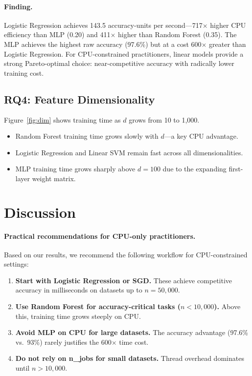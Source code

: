\documentclass[10pt,twocolumn]{article}
\begin{document}
\paragraph{Finding.}
Logistic Regression achieves 143.5 accuracy-units per second—717$\times$ higher 
CPU efficiency than MLP (0.20) and 411$\times$ higher than Random Forest (0.35). 
The MLP achieves the highest raw accuracy (97.6\%) but at a cost 600$\times$ 
greater than Logistic Regression.
For CPU-constrained practitioners, linear models provide a strong Pareto-optimal 
choice: near-competitive accuracy with radically lower training cost.

\subsection{RQ4: Feature Dimensionality}

Figure~\ref{fig:dim} shows training time as $d$ grows from 10 to 1,000.

\begin{itemize}[nosep,leftmargin=*]
  \item Random Forest training time grows slowly with $d$—a key CPU advantage.
  \item Logistic Regression and Linear SVM remain fast across all dimensionalities.
  \item MLP training time grows sharply above $d=100$ due to the expanding 
        first-layer weight matrix.
\end{itemize}

\section{Discussion}

\paragraph{Practical recommendations for CPU-only practitioners.}

Based on our results, we recommend the following workflow for CPU-constrained settings:

\begin{enumerate}[nosep,leftmargin=*]
  \item \textbf{Start with Logistic Regression or SGD.} These achieve competitive 
        accuracy in milliseconds on datasets up to $n=50{,}000$.
  \item \textbf{Use Random Forest for accuracy-critical tasks ($n < 10{,}000$).} 
        Above this, training time grows steeply on CPU.
  \item \textbf{Avoid MLP on CPU for large datasets.} The accuracy advantage 
        (97.6\% vs.\ 93\%) rarely justifies the 600$\times$ time cost.
  \item \textbf{Do not rely on n\_jobs for small datasets.} Thread overhead 
        dominates until $n > 10{,}000$.
\end{enumerate}
\end{document}
